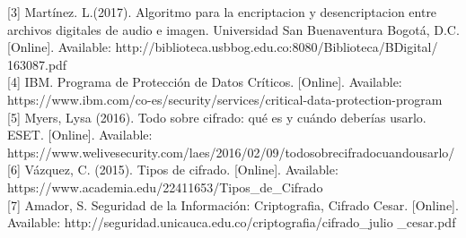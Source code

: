 \documentclass[9pt,24pt,twocolumn]{article}
\begin{document}
{[3] Martínez. L.(2017). Algoritmo para la encriptacion y desencriptacion entre archivos digitales de audio e imagen. Universidad San Buenaventura Bogotá, D.C. [Online]. Available: }
{http://biblioteca.usbbog.edu.co:8080/Biblioteca/BDigital/}
{163087.pdf}
\\

{[4] IBM. Programa de Protección de Datos Críticos. [Online]. Available:}
{https://www.ibm.com/co-es/security/services/critical-data-protection-program}
\\

{[5] Myers, Lysa (2016). Todo sobre cifrado: qué es y cuándo deberías usarlo. ESET. [Online]. Available:}
{https://www.welivesecurity.com/la\-es/2016/02/09/todo\-sobre\-cifrado\-cuando\-usarlo/}
\\

{[6] Vázquez, C. (2015). Tipos de cifrado. [Online]. Available:}
{https://www.academia.edu/22411653/Tipos\_de\_Cifrado}
\\

{[7] Amador, S. Seguridad de la Información: Criptografia, Cifrado Cesar. [Online]. Available:}
{http://seguridad.unicauca.edu.co/criptografia/cifrado\_julio}
{\_cesar.pdf}
\end{document}
